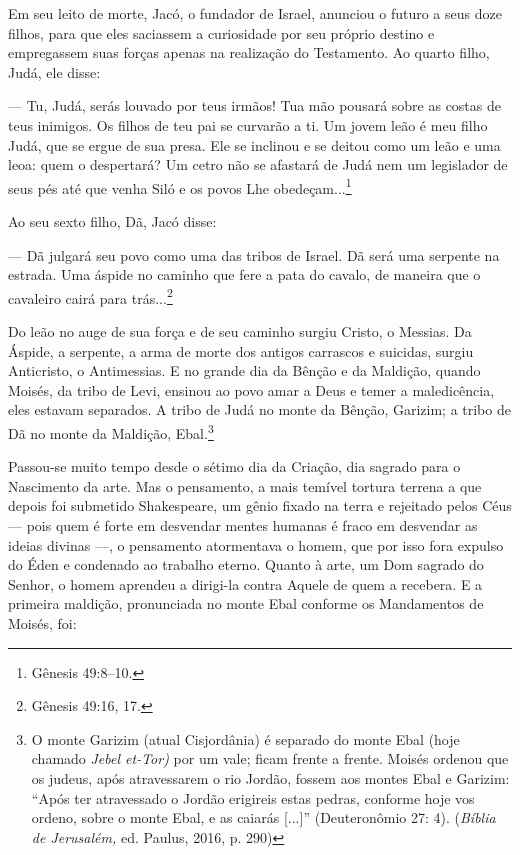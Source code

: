 Em seu leito de morte, Jacó, o fundador de Israel, anunciou o futuro a
seus doze filhos, para que eles saciassem a curiosidade por seu próprio
destino e empregassem suas forças apenas na realização do Testamento. Ao
quarto filho, Judá, ele disse:

--- Tu, Judá, serás louvado por teus irmãos! Tua mão pousará sobre as
costas de teus inimigos. Os filhos de teu pai se curvarão a ti. Um jovem
leão é meu filho Judá, que se ergue de sua presa. Ele se inclinou e se
deitou como um leão e uma leoa: quem o despertará? Um cetro não se
afastará de Judá nem um legislador de seus pés até que venha Siló e os
povos Lhe obedeçam...\footnote{Gênesis 49:8--10.}

Ao seu sexto filho, Dã, Jacó disse:

--- Dã julgará seu povo como uma das tribos de Israel. Dã será uma
serpente na estrada. Uma áspide no caminho que fere a pata do cavalo, de
maneira que o cavaleiro cairá para trás...\footnote{Gênesis 49:16, 17.}

Do leão no auge de sua força e de seu caminho surgiu Cristo, o Messias.
Da Áspide, a serpente, a arma de morte dos antigos carrascos e suicidas,
surgiu Anticristo, o Antimessias. E no grande dia da Bênção e da
Maldição, quando Moisés, da tribo de Levi, ensinou ao povo amar a Deus e
temer a maledicência, eles estavam separados. A tribo de Judá no monte
da Bênção, Garizim; a tribo de Dã no monte da Maldição, Ebal.\footnote{O
  monte Garizim (atual Cisjordânia) é separado do monte Ebal (hoje
  chamado \emph{Jebel et-Tor)} por um vale; ficam frente a frente.
  Moisés ordenou que os judeus, após atravessarem o rio Jordão, fossem
  aos montes Ebal e Garizim: ``Após ter atravessado o Jordão erigireis
  estas pedras, conforme hoje vos ordeno, sobre o monte Ebal, e as
  caiarás {[}...{]}'' (Deuteronômio 27: 4). (\emph{Bíblia de Jerusalém,}
  ed. Paulus, 2016, p. 290)}

Passou-se muito tempo desde o sétimo dia da Criação, dia sagrado para o
Nascimento da arte. Mas o pensamento, a mais temível tortura terrena a
que depois foi submetido Shakespeare, um gênio fixado na terra e
rejeitado pelos Céus --- pois quem é forte em desvendar mentes humanas é
fraco em desvendar as ideias divinas ---, o pensamento atormentava o
homem, que por isso fora expulso do Éden e condenado ao trabalho eterno.
Quanto à arte, um Dom sagrado do Senhor, o homem aprendeu a dirigi-la
contra Aquele de quem a recebera. E a primeira maldição, pronunciada no
monte Ebal conforme os Mandamentos de Moisés, foi:

